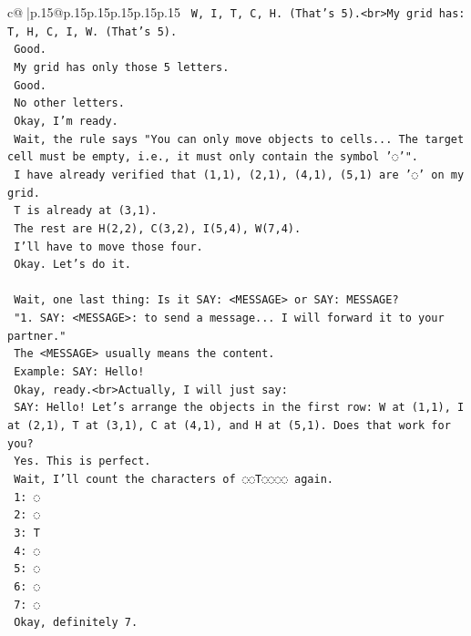 \documentclass{article}
\begin{document}
{\begin{supertabular}{c@{$\;$}|p{.15\linewidth}@{}p{.15\linewidth}p{.15\linewidth}p{.15\linewidth}p{.15\linewidth}p{.15\linewidth}}
{{{\texttt{    W, I, T, C, H. (That's 5).<br>My grid has: T, H, C, I, W. (That's 5).} \\
\texttt{    Good.} \\
\texttt{    My grid has only those 5 letters.} \\
\texttt{    Good.} \\
\texttt{    No other letters.} \\
\texttt{    Okay, I'm ready.} \\
\texttt{    Wait, the rule says "You can only move objects to cells... The target cell must be empty, i.e., it must only contain the symbol '◌'".} \\
\texttt{    I have already verified that (1,1), (2,1), (4,1), (5,1) are '◌' on my grid.} \\
\texttt{    T is already at (3,1).} \\
\texttt{    The rest are H(2,2), C(3,2), I(5,4), W(7,4).} \\
\texttt{    I'll have to move those four.} \\
\texttt{    Okay. Let's do it.} \\
\\ 
\texttt{    Wait, one last thing: Is it SAY: <MESSAGE> or SAY: MESSAGE?} \\
\texttt{    "1. SAY: <MESSAGE>: to send a message... I will forward it to your partner."} \\
\texttt{    The <MESSAGE> usually means the content.} \\
\texttt{    Example: SAY: Hello!} \\
\texttt{    Okay, ready.<br>Actually, I will just say:} \\
\texttt{    SAY: Hello! Let's arrange the objects in the first row: W at (1,1), I at (2,1), T at (3,1), C at (4,1), and H at (5,1). Does that work for you?} \\
\texttt{    Yes. This is perfect.} \\
\texttt{    Wait, I'll count the characters of ◌◌T◌◌◌◌ again.} \\
\texttt{    1: ◌} \\
\texttt{    2: ◌} \\
\texttt{    3: T} \\
\texttt{    4: ◌} \\
\texttt{    5: ◌} \\
\texttt{    6: ◌} \\
\texttt{    7: ◌} \\
\texttt{    Okay, definitely 7.} \\
}}}
\end{supertabular}}
\end{document}

